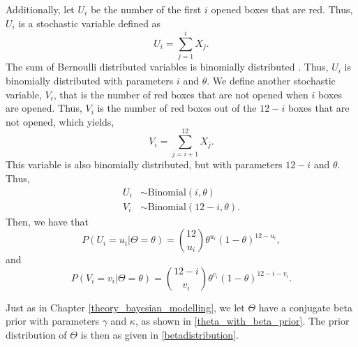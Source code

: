 Additionally, let $U_i$ be the number of the first $i$ opened boxes that are red. Thus, $U_i$ is a stochastic variable defined as
\begin{equation}
\label{def_of_U}
    U_i = \sum_{j=1}^{i} X_j. 
\end{equation}
The sum of Bernoulli distributed variables is binomially distributed \citep{statinf}. Thus, $U_i$ is binomially distributed with parameters $i$ and $\theta$. We define another stochastic variable, $V_i$, that is the number of red boxes that are not opened when $i$ boxes are opened. Thus, $V_i$ is the number of red boxes out of the $12-i$ boxes that are not opened, which yields,
\begin{equation}
\label{def_of_V}
    V_i = \sum_{j=i+1}^{12} X_j.
\end{equation}
This variable is also binomially distributed, but with parameters $12-i$ and $\theta$. Thus,
\begin{equation}
\label{U_V_binomal_distri}
    \begin{aligned}
        U_i &\sim \text{Binomial}(i,\theta)\\
        V_i &\sim \text{Binomial}(12-i,\theta).
    \end{aligned}
\end{equation}
Then, we have that 
\begin{equation}
\label{ui_prob_mass}
    P(U_i=u_i|\Theta=\theta) = \binom{12}{u_i} \theta^{u_i}(1-\theta)^{12-u_i},
\end{equation}
and
\begin{equation}
\label{vi_prob_mass}
    P(V_i=v_i|\Theta=\theta) = \binom{12-i}{v_i} \theta^{v_i}(1-\theta)^{12-i-v_i}.
\end{equation}

Just as in Chapter \ref{theory_bayesian_modelling}, we let $\Theta$ have a conjugate beta prior with parameters $\gamma$ and $\kappa$, as shown in \eqref{theta_with_beta_prior}.
The prior distribution of $\Theta$ is then as given in \eqref{betadistribution}.

